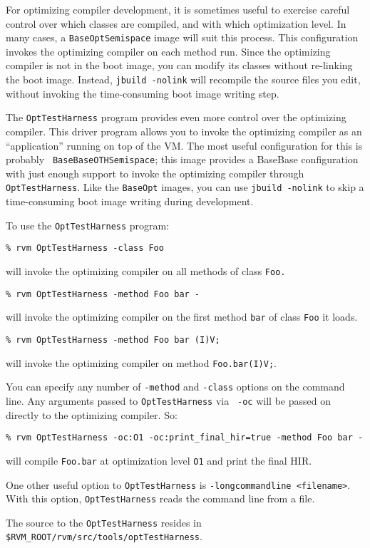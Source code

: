 For optimizing compiler development, it is sometimes useful to exercise
careful control over which classes are compiled, and with which
optimization level.  In many cases, a {\tt BaseOptSemispace} image will
suit this process.  This configuration invokes the optimizing compiler on
each method run.  Since the optimizing compiler is not in the boot image, 
you can modify its classes without re-linking the boot image.  Instead,
{\tt jbuild -nolink} will recompile the source files you edit, without
invoking the time-consuming boot image writing step.

The {\tt OptTestHarness} program provides even more control over the
optimizing compiler.  This driver program allows you to invoke the
optimizing compiler as an ``application'' running on top of the VM.
The most useful configuration for this is probably {\tt
BaseBaseOTHSemispace}; this image provides a BaseBase configuration with just
enough support to invoke the optimizing compiler through {\tt
OptTestHarness}.  Like the {\tt BaseOpt} images, you can use {\tt jbuild
-nolink} to skip a time-consuming boot image writing during development.

To use the {\tt OptTestHarness} program:
\begin{verbatim}
% rvm OptTestHarness -class Foo
\end{verbatim}
will invoke the optimizing compiler on all methods of class {\tt Foo.}

\begin{verbatim}
% rvm OptTestHarness -method Foo bar - 
\end{verbatim}
will invoke the optimizing compiler on the first method {\tt bar} of class
{\tt Foo} it loads.

\begin{verbatim}
% rvm OptTestHarness -method Foo bar (I)V; 
\end{verbatim} 
will invoke the optimizing compiler on method {\tt Foo.bar(I)V;}.

You can specify any number of {\tt -method} and {\tt -class} options on
the command line.  Any arguments passed to {\tt OptTestHarness} via {\tt
-oc} will be passed on directly to the optimizing compiler.  So:

\begin{verbatim}
% rvm OptTestHarness -oc:O1 -oc:print_final_hir=true -method Foo bar -
\end{verbatim} 
will compile {\tt Foo.bar} at optimization level {\tt O1} and print
the final HIR.

One other useful option to {\tt OptTestHarness} is {\tt -longcommandline
<filename>}. With this option, {\tt OptTestHarness} reads the command line
from a file.

The source to the {\tt OptTestHarness} resides in 
{\tt \$RVM\_ROOT/rvm/src/tools/optTestHarness}.
